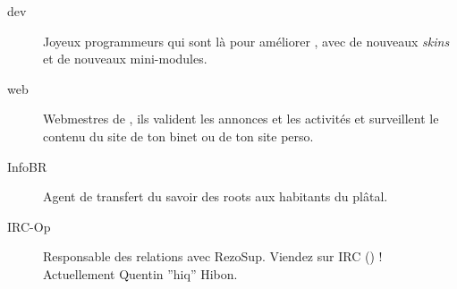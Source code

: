 \begin{description}
  \item[dev]{Joyeux programmeurs qui sont l\`a pour am\'eliorer \fkz, avec de nouveaux \emph{skins} et de nouveaux mini-modules.}


  \item[web] {Webmestres de \fkz, ils valident les annonces et les activit\'es et surveillent le contenu du site de ton binet ou de ton site perso.}


  \item[InfoBR]{Agent de transfert du savoir des roots aux habitants du pl\^atal.}



  \item[IRC-Op]{Responsable des relations avec RezoSup. Viendez sur IRC () ! \linebreak Actuellement Quentin ''hiq'' Hibon.}




\end{description}


